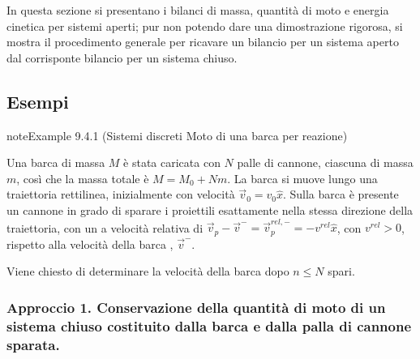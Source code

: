 \documentclass[letterpaper,10pt,italian]{jupyterBook}
\begin{document}
\sphinxAtStartPar
In questa sezione si presentano i bilanci di massa, quantità di moto e energia cinetica per sistemi aperti; pur non potendo dare una dimostrazione rigorosa, si mostra il procedimento generale per ricavare un bilancio per un sistema aperto dal corrisponte bilancio per un sistema chiuso.


\subsection{Esempi}
\label{\detokenize{ch/mechanics/dynamics-eom-open:esempi}}\label{ch/mechanics/dynamics-eom-open:example-0}
\begin{sphinxadmonition}{note}{Example 9.4.1 (Sistemi discreti \sphinxhyphen{} Moto di una barca per reazione)}



\sphinxAtStartPar
Una barca di massa \(M\) è stata caricata con \(N\) palle di cannone, ciascuna di massa \(m\), così che la massa totale è \(M = M_0 + N m\). La barca si muove lungo una traiettoria rettilinea, inizialmente con velocità \(\vec{v}_0 = v_0 \hat{x}\). Sulla barca è presente un cannone in grado di sparare i proiettili esattamente nella stessa direzione della traiettoria, con un a velocità relativa di \(\vec{v}_p - \vec{v}^- = \vec{v}_p^{rel,-} = - v^{rel} \hat{x}\), con \(v^{rel} > 0\), rispetto alla velocità della barca , \(\vec{v}^-\).

\sphinxAtStartPar
Viene chiesto di determinare la velocità della barca dopo \(n \le N\) spari.  

\sphinxAtStartPar
{}
\subsubsection*{Approccio 1. Conservazione della quantità di moto di un sistema chiuso costituito dalla barca e dalla palla di cannone sparata.}




\end{sphinxadmonition}
\end{document}
